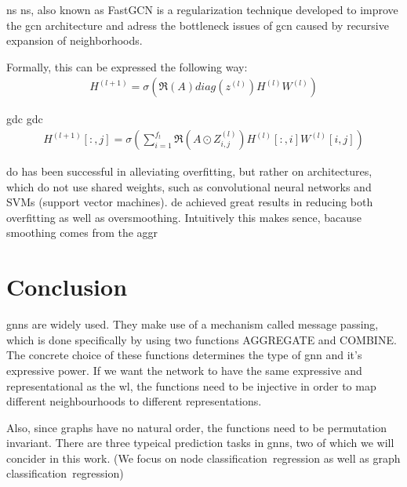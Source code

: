 \ac{ns}
\ac{ns}\cite{Chen2018}, also known as FastGCN is a regularization technique
developed to improve the \ac{gcn}\cite{Kipf2017} architecture and adress the bottleneck issues
of \ac{gcn} caused by recursive expansion of neighborhoods.

Formally, this can be expressed the following way:
\begin{align*}
    H^{(l+1)} = \sigma (\mathfrak{R}(A) diag(z^{(l)}) H^{(l)} W^{(l)})
\end{align*}



\ac{gdc}
\ac{gdc}\cite{Hasanzadeh2020}
\begin{align*}
    H^{(l+1)}[:,j] = \sigma (\sum_{i=1}^{f_{t}}\mathfrak{R}(A \odot Z_{i,j}^{(l)})H^{(l)}[:,i]W^{(l)}[i,j])
\end{align*}




\acf{do} has been successful in alleviating overfitting, but rather on architectures, which
do not use shared weights, such as convolutional neural networks and SVMs (support vector machines).
\acf{de} achieved great results in reducing both overfitting as well as oversmoothing. Intuitively this
makes sence, bacause smoothing comes from the aggr

\section{Conclusion}
\label{sec:related:conclusion}
\acp{gnn} are widely used. They make use of a mechanism called message passing, which
is done specifically by using two functions AGGREGATE and COMBINE.
The concrete choice of these functions determines the type of \ac{gnn}
and it's expressive power. If we want the network to have the same expressive
and representational as the \ac{wl}, the functions need to be injective in order
to map different neighbourhoods to different representations.

Also, since graphs have no natural order, the functions need to be permutation
invariant.
There are three typeical prediction tasks in \acp{gnn}, two of which we will concider
in this work. (We focus on node classification\ regression as well as
graph classification\ regression)